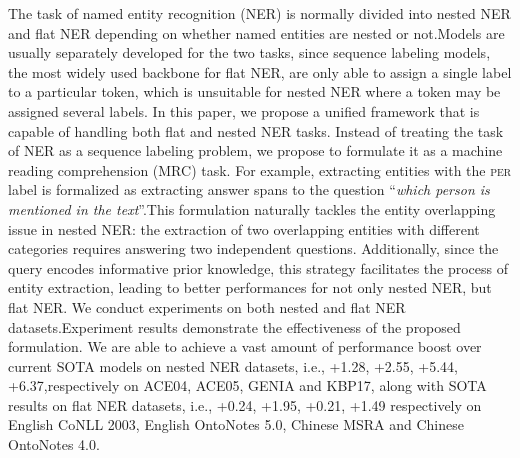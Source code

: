 The task of named entity recognition (NER)  is normally divided into nested NER and flat NER depending  on whether named entities are nested or not.Models are usually separately developed for the two tasks, since   sequence labeling models, the most widely used backbone for  flat NER,  are only able to assign a single label to a particular token, which is unsuitable for nested NER where a token may be assigned several labels. In this paper, we propose a unified framework  that is capable of handling both flat and nested NER tasks. Instead of treating the task of NER as a sequence labeling problem, we propose to formulate it as a machine reading comprehension (MRC) task. For example, extracting entities with the \textsc{per} label is formalized as extracting answer spans to the question  ``{\it which person is mentioned in the text}''.This formulation naturally  tackles the entity overlapping issue in nested NER: the extraction of two overlapping entities with different categories requires answering two independent questions. Additionally, since the query encodes informative prior knowledge, this strategy facilitates the process of entity extraction, leading to better performances for not only nested NER, but flat NER. We conduct experiments on both nested and flat NER datasets.Experiment results demonstrate  the effectiveness of the proposed formulation. We are able to achieve a vast amount of performance boost over current SOTA models on nested NER datasets, i.e.,   +1.28, +2.55, +5.44, +6.37,respectively on ACE04, ACE05, GENIA and KBP17, along with SOTA results on flat NER datasets, i.e., +0.24, +1.95, +0.21, +1.49 respectively on English CoNLL 2003, English OntoNotes 5.0, Chinese MSRA and Chinese OntoNotes 4.0.
